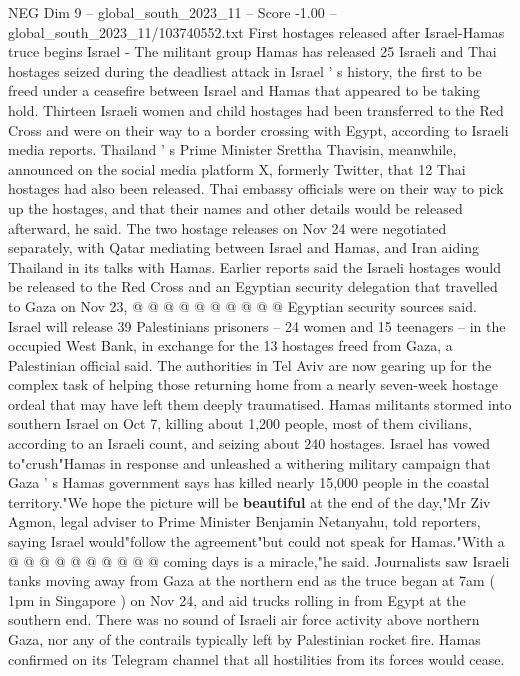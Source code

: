 \begin{textsample}{NEG Dim 9 – global\_south\_2023\_11 – Score -1.00 – global\_south\_2023\_11/103740552.txt}  \label{ex:f9_neg_432}
First hostages released after Israel-Hamas truce begins Israel - The militant group Hamas has released 25 Israeli and Thai hostages seized during the deadliest attack in Israel ' s history, the first to be freed under a ceasefire between Israel and Hamas that appeared to be taking hold.
Thirteen Israeli women and child hostages had been transferred to the Red Cross and were on their way to a border crossing with Egypt, according to Israeli media reports.
Thailand ' s Prime Minister Srettha Thavisin, meanwhile, announced on the social media platform X, formerly Twitter, that 12 Thai hostages had also been released.
Thai embassy officials were on their way to pick up the hostages, and that their names and other details would be released afterward, he said.
The two hostage releases on Nov 24 were negotiated separately, with Qatar mediating between Israel and Hamas, and Iran aiding Thailand in its talks with Hamas.
Earlier reports said the Israeli hostages would be released to the Red Cross and an Egyptian security delegation that travelled to Gaza on Nov 23, @ @ @ @ @ @ @ @ @ @ Egyptian security sources said.
Israel will release 39 Palestinians prisoners -- 24 women and 15 teenagers -- in the occupied West Bank, in exchange for the 13 hostages freed from Gaza, a Palestinian official said.
The authorities in Tel Aviv are now gearing up for the complex task of helping those returning home from a nearly seven-week hostage ordeal that may have left them deeply traumatised.
Hamas militants stormed into southern Israel on Oct 7, killing about 1,200 people, most of them civilians, according to an Israeli count, and seizing about 240 hostages.
Israel has vowed to"crush"Hamas in response and unleashed a withering military campaign that Gaza ' s Hamas government says has killed nearly 15,000 people in the coastal territory."We hope the picture will be \textbf{beautiful} at the end of the day,"Mr Ziv Agmon, legal adviser to Prime Minister Benjamin Netanyahu, told reporters, saying Israel would"follow the agreement"but could not speak for Hamas."With a @ @ @ @ @ @ @ @ @ @ coming days is a miracle,"he said.
Journalists saw Israeli tanks moving away from Gaza at the northern end as the truce began at 7am ( 1pm in Singapore ) on Nov 24, and aid trucks rolling in from Egypt at the southern end.
There was no sound of Israeli air force activity above northern Gaza, nor any of the contrails typically left by Palestinian rocket fire.
Hamas confirmed on its Telegram channel that all hostilities from its forces would cease.

\end{textsample}
